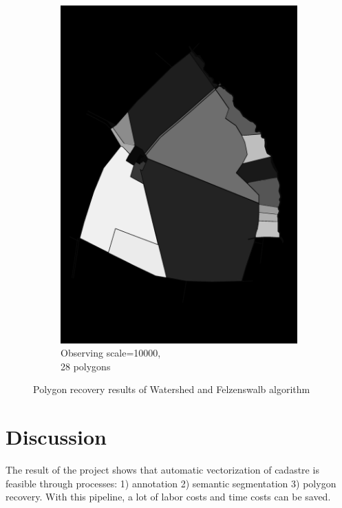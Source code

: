 \documentclass[12pt]{article}
\begin{document}
\begin{figure}[H]
\begin{subfigure}[b]{.3\textwidth}
		\includegraphics[width=1\linewidth]{images/polygon_recovery/felzenswalb2_scale10000_region49.png}  
		\caption{Observing scale=10000, \\ 28 polygons}
	\end{subfigure}
	
	\caption{Polygon recovery results of Watershed and Felzenswalb algorithm}
	\label{fig:watershed2}
\end{figure}




\section{Discussion}
The result of the project shows that automatic vectorization of cadastre is feasible through processes: 1) annotation 2) semantic segmentation 3) polygon recovery. With this pipeline, a lot of labor costs and time costs can be saved. 
\end{document}
